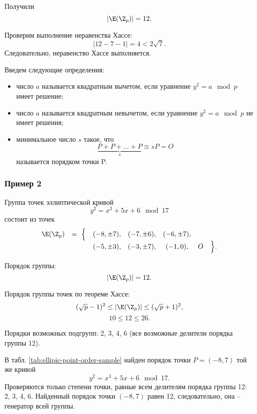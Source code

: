 Получили
    \[ |\E(\Z_p)| = 12. \]

Проверим выполнение неравенства Хассе:
    \[ \left| 12 - 7 - 1 \right| = 4 < 2 \sqrt{7}. \]
Следовательно, неравенство Хассе выполняется.

Введем следующие определения:
\begin{itemize}
    \item число $a$ называется квадратным вычетом, если уравнение $y^{2} =a \mod p$ имеет решение;
    \item число $a$ называется квадратным невычетом, если уравнение $y^{2} =a \mod p$ не имеет решения;
    \item минимальное число $s$ такое, что
        \[ \underbrace{P + P + \ldots + P}_{s} \equiv s P = O \]
        называется порядком точки P.
\end{itemize}



\subsubsection{Пример 2}

Группа точек эллиптической кривой
    \[ y^2 = x^3 + 5 x + 6 \mod 17 \]
состоит из точек
\[ \begin{array}{ccccccc}
    \E(\Z_p) & =~ \Big\{ & (-8, \pm 7), & (-7, \pm 6), & (-6, \pm 7), &   & \\
             &           & (-5, \pm 3), & (-3, \pm 7), & (-1, 0),     & O & \Big\}. \\
\end{array} \]

Порядок группы:
    \[ |\E(\Z_p)| = 12. \]

Порядок группы точек по теореме Хассе:
    \[ (\sqrt{p}-1)^2 \leq |\E(\Z_p)| \leq (\sqrt{p}+1)^2, \]
    \[ 10 \leq 12 \leq 26. \]

Порядки возможных подгрупп: 2, 3, 4, 6 (все возможные делители порядка группы 12).

В табл. \ref{tab:ellipic-point-order-sample} найден порядок точки $P = (-8, 7)$ той же кривой
    \[ y^2 = x^3 + 5 x + 6 \mod 17. \]
Проверяются только степени точки, равные всем делителям порядка группы 12: 2, 3, 4, 6. Найденный порядок точки $(-8,7)$ равен 12, следовательно, она -- генератор всей группы.


